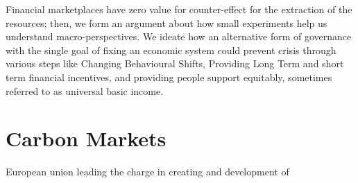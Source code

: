\documentclass[11pt]{article}
\begin{document}
Financial marketplaces have zero value for counter-effect for the extraction of the resources; then, we form an argument about how small experiments help us understand macro-perspectives. We ideate how an alternative form of governance with the single goal of fixing an economic system could prevent crisis through various steps like Changing Behavioural Shifts, Providing Long Term and short term financial incentives, and providing people support equitably, sometimes referred to as universal basic income. 





\pagebreak
\section{Carbon Markets}

European union leading the charge in creating and development of 
 \\

\end{document}

